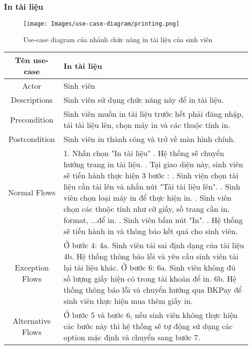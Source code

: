 \subsubsection{In tài liệu}
\begin{figure}[H]
    \centering
    \texttt{[image: Images/use-case-diagram/printing.png]}
    \caption{Use-case diagram của nhánh chức năng in tài liệu của sinh viên}
    \label{fig:enter-label}
\end{figure}
\begin{xltabular}{\textwidth}{|c|X|}
    \hline
    \textbf{Tên use-case} & \textbf{In tài liệu} \\
    \hline
    Actor & Sinh viên \\
    \hline
    Descriptions & Sinh viên sử dụng chức năng này để in tài liệu. \\
    \hline 
    Precondition & Sinh viên muốn in tài liệu trước hết phải đăng nhập, tải tài liệu lên, chọn máy in và các thuộc tính in. \\
    \hline
    Postcondition & Sinh viên in thành công và trở về màn hình chính.\\
    \hline
    Normal Flows & 
    1. Nhấn chọn "In tài liệu"
    . Hệ thống sẽ chuyển hướng trang in tài liệu.
    . Tại giao diện này, sinh viên sẽ tiến hành thực hiện 3 bước : 
    . Sinh viện chọn tài liệu cần tải lên và nhấn nút "Tải tài liệu lên".
    . Sinh viên chọn loại máy in để thực hiện in.
    . Sinh viên chọn các thuộc tính như cỡ giấy, số trang cần in, format, ...để in.
    . Sinh viên bấm nút "In".
    . Hệ thống sẽ tiến hành in và thông báo kết quả cho sinh viên.
    \\
    \hline
    Exception Flows & 
    Ở bước 4:
    \newline
    4a. Sinh viên tải sai định dạng của tài liệu 
    \newline
    4b. Hệ thống thông báo lỗi và yêu cầu sinh viên tải lại tài liệu khác.
    \newline
    Ở bước 6:
    \newline
    6a. Sinh viên không đủ số lượng giấy hiện có trong tài khoản để in.
    \newline
    6b. Hệ thống thông báo lỗi và chuyển hướng qua BKPay để sinh viên thực hiện mua thêm giấy in. \\
    \hline
    Alternative Flows & 
    Ở bước 5 và bước 6, nếu sinh viên không thực hiện các bước này thì hệ thống sẽ tự động sử dụng các option mặc định và chuyển sang bước 7. \\
    \hline
\end{xltabular}

